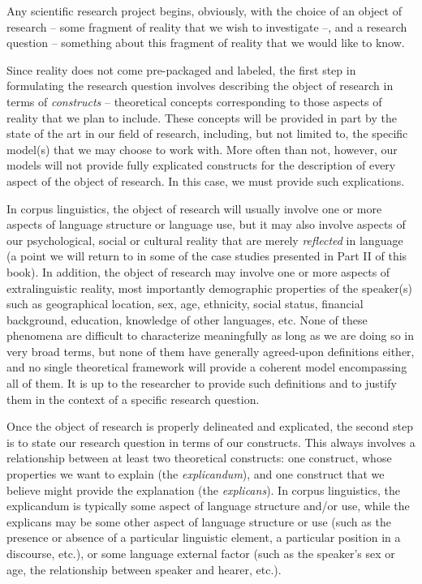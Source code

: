 Any scientific research project begins, obviously, with the choice of an object of research -- some fragment of reality that we wish to investigate --, and a research question -- something about this fragment of reality that we would like to know.

Since reality does not come pre\hyp{}packaged and labeled, the first step in formulating the research question involves describing the object of research in terms of \emph{constructs} -- theoretical concepts corresponding to those aspects of reality that we plan to include. These concepts will be provided in part by the state of the art in our field of research, including, but not limited to, the specific model(s) that we may choose to work with. More often than not, however, our models will not provide fully explicated constructs for the description of every aspect of the object of research. In this case, we must provide such explications.

In corpus linguistics, the object of research will usually involve one or more aspects of language structure or language use, but it may also involve aspects of our psychological,  social or cultural  reality that are merely \emph{reflected} in language (a point we will return to in some of the case studies presented in Part II of this book). In addition, the object of research may involve one or more aspects of extralinguistic reality, most importantly demographic  properties of the speaker(s) such as geographical location, sex, age,  ethnicity, social status, financial background, education, knowledge of other languages, etc. None of these phenomena are difficult to characterize meaningfully as long as we are doing so in very broad terms, but none of them have generally agreed\hyp{}upon definitions either, and no single theoretical framework will provide a coherent model encompassing all of them. It is up to the researcher to provide such definitions and to justify them in the context of a specific research question.

Once the object of research is properly delineated and explicated, the second step is to state our research question in terms of our constructs. This always involves a relationship between at least two theoretical constructs: one construct, whose properties we want to explain  (the \emph{explicandum}), and one construct that we believe might provide the explanation (the \emph{explicans}). In corpus linguistics, the explicandum is typically some aspect of language structure and\slash or use, while the explicans may be some other aspect of language structure or use (such as the presence or absence of a particular linguistic element, a particular position in a discourse, etc.), or some language external factor (such as the speaker's sex or age,  the relationship between speaker and hearer, etc.).

